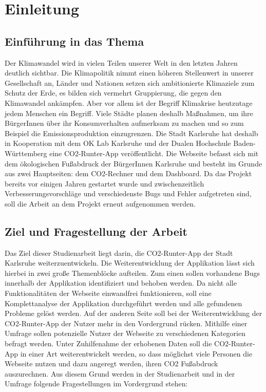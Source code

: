 
\chapter{Einleitung}
\label{chapter:1}

\section{Einführung in das Thema}

Der Klimawandel wird in vielen Teilen unserer Welt in den letzten Jahren deutlich sichtbar.
Die Klimapolitik nimmt einen höheren Stellenwert in unserer Gesellschaft an, Länder und Nationen setzen sich ambitionierte Klimaziele zum Schutz der Erde, es bilden sich vermehrt Gruppierung, die gegen den Klimawandel ankämpfen. Aber vor allem ist der Begriff Klimakrise heutzutage jedem Menschen ein Begriff. Viele Städte planen deshalb Maßnahmen, um ihre BürgerInnen über ihr Konsumverhalten aufmerksam zu machen und so zum Beispiel die Emissionsproduktion einzugrenzen.  Die Stadt Karlsruhe hat deshalb in Kooperation mit dem OK Lab Karlsruhe und der Dualen Hochschule Baden-Württemberg eine CO2-Runter-App veröffentlicht. Die Webseite befasst sich mit dem ökologischen Fußabdruck der BürgerInnen Karlsruhe und besteht im Grunde aus zwei Hauptseiten: dem CO2-Rechner und dem Dashboard. Da das Projekt bereits vor einigen Jahren gestartet wurde und zwischenzeitlich Verbesserungsvorschläge und verschiedenste Bugs und Fehler aufgetreten sind, soll die Arbeit an dem Projekt erneut aufgenommen werden.



\section{Ziel und Fragestellung der Arbeit}

Das Ziel dieser Studienarbeit liegt darin, die CO2-Runter-App der Stadt Karlsruhe weiterzuentwickeln. Die Weiterentwicklung der Applikation lässt sich hierbei in zwei große Themenblöcke aufteilen. Zum einen sollen vorhandene Bugs innerhalb der Applikation identifiziert und behoben werden. Da nicht alle Funktionalitäten der Webseite einwandfrei funktionieren, soll eine Komplettanalyse der Applikation durchgeführt werden und alle gefundenen Probleme gelöst werden. Auf der anderen Seite soll bei der Weiterentwicklung der CO2-Runter-App der Nutzer mehr in den Vordergrund rücken. Mithilfe einer Umfrage sollen potenzielle Nutzer der Webseite zu verschiedenen Kategorien befragt werden. Unter Zuhilfenahme der erhobenen Daten soll die CO2-Runter-App in einer Art weiterentwickelt werden, so dass möglichst viele Personen die Webseite nutzen und dazu angeregt werden, ihren CO2 Fußabdruck auszurechnen. Aus diesem Grund werden in der Studienarbeit und in der Umfrage folgende Fragestellungen im Vordergrund stehen:

